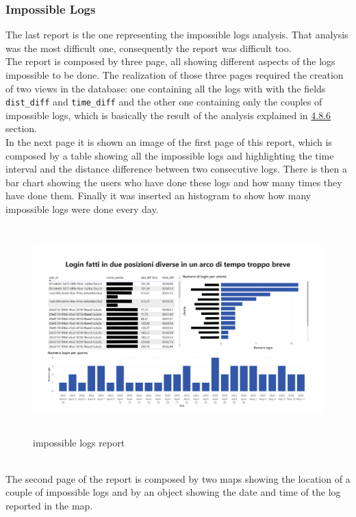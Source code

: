 \documentclass[12pt, a4paper, oneside]{article}
\begin{document}
\subsubsection{Impossible Logs}
The last report is the one representing the impossible logs analysis. That analysis was the most difficult one, consequently the report was difficult too.\\
The report is composed by three page, all showing different aspects of the logs impossible to be done. The realization of those three pages required the creation of two views in the database: one containing
all the logs with with the fields \texttt{dist\_diff} and \texttt{time\_diff} and the other one containing only the couples of impossible logs, which is basically the result of the analysis explained in
\hyperref[subsubsec:impossible]{4.8.6} section.\\
In the next page it is shown an image of the first page of this report, which is composed by a table showing all the impossible logs and highlighting the time interval and the distance difference between two
consecutive logs. There is then a bar chart showing the users who have done these logs and how many times they have done them. Finally it was inserted an histogram to show how many impossible logs were done
every day.
\newline\newline\newline\newline
\begin{figure}[h]
    \centering
    \includegraphics[width=\textwidth, height=8cm]{impossible-logs.png}
    \caption{impossible logs report}
\end{figure}\\
The second page of the report is composed by two maps showing the location of a couple of impossible logs and by an object showing the date and time of the log reported in the map.\\
\end{document}
